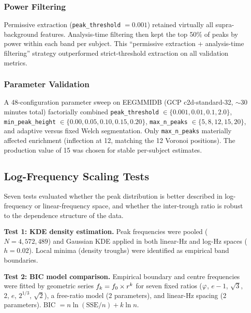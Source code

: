 \subsubsection{Power Filtering}
\label{sec:power_filter}

Permissive extraction (\texttt{peak\_threshold} $= 0.001$) retained virtually all supra-background features. Analysis-time filtering then kept the top 50\% of peaks by power within each band per subject. This ``permissive extraction + analysis-time filtering'' strategy outperformed strict-threshold extraction on all validation metrics.

\subsubsection{Parameter Validation}
\label{sec:param_validation}

A 48-configuration parameter sweep on EEGMMIDB (GCP c2d-standard-32, $\sim$30 minutes total) factorially combined \texttt{peak\_threshold} $\in \{0.001, 0.01, 0.1, 2.0\}$, \texttt{min\_peak\_height} $\in \{0.00, 0.05, 0.10, 0.15, 0.20\}$, \texttt{max\_n\_peaks} $\in \{5, 8, 12, 15, 20\}$, and adaptive versus fixed Welch segmentation. Only \texttt{max\_n\_peaks} materially affected enrichment (inflection at 12, matching the 12 Voronoi positions). The production value of 15 was chosen for stable per-subject estimates.

\subsection{Log-Frequency Scaling Tests}
\label{sec:scaling_methods}

Seven tests evaluated whether the peak distribution is better described in log-frequency or linear-frequency space, and whether the inter-trough ratio is robust to the dependence structure of the data.

\textbf{Test 1: KDE density estimation.} Peak frequencies were pooled ($N = 4{,}572{,}489$) and Gaussian KDE applied in both linear-Hz and log-Hz spaces ($h = 0.02$). Local minima (density troughs) were identified as empirical band boundaries.

\textbf{Test 2: BIC model comparison.} Empirical boundary and centre frequencies were fitted by geometric series $f_k = f_0 \times r^k$ for seven fixed ratios ($\varphi$, $e-1$, $\sqrt{3}$, 2, $e$, $2^{1/3}$, $\sqrt{2}$), a free-ratio model (2 parameters), and linear-Hz spacing (2 parameters). BIC $= n \ln(\text{SSE}/n) + k \ln n$.

